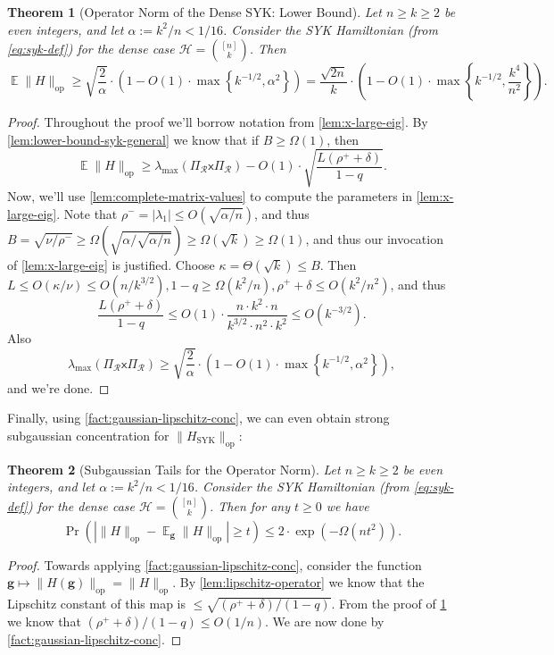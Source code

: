 \documentclass
[11pt,letterpaper]
{article}
\newtheorem{theorem}{Theorem}[section]
\theoremstyle{definition}
\newcommand{\op}{\operatorname{op}}
\newcommand{\sfx}{\mathsf x}
\newcommand{\1}{\mathbf{1}}
\newcommand{\cH}{\mathcal H}
\DeclareMathOperator*{\E}{\mathbb{E}}
\newcommand{\cR}{\mathcal R}
\renewcommand{\geq}{\geqslant}
\renewcommand{\leq}{\leqslant}
\newcommand{\syk}{\operatorname{SYK}}
\begin{document}
\begin{theorem}[Operator Norm of the Dense SYK: Lower Bound]\label{thm:syk-spectral-norm-lower}
    Let $n\geq k\geq 2$ be even integers, and let $\alpha:= k^2/n < 1/16$. Consider the SYK Hamiltonian (from \cref{eq:syk-def}) for the dense case $\cH = \binom{[n]}{k}$. Then 
    \[\E\|H\|_{\operatorname{op}}\geq \sqrt{\frac{2}{\alpha}}\cdot\left(1 - O(1)\cdot\max\left\{k^{-1/2}, \alpha^2\right\}\right) = \frac{\sqrt{2n}}{k}\cdot\left(1 - O(1)\cdot\max\left\{k^{-1/2}, \frac{k^4}{n^2}\right\}\right).\]
\end{theorem}
\begin{proof}
    Throughout the proof we'll borrow notation from \cref{lem:x-large-eig}. By \cref{lem:lower-bound-syk-general} we know that if $B\geq\Omega(1)$, then
    \[\E\|H\|_{\operatorname{op}}\geq \lambda_{\max}(\Pi_\cR\sfx\Pi_\cR) - O(1)\cdot \sqrt{\frac{L(\rho^+ + \delta)}{1 - q}}.\]
    Now, we'll use \cref{lem:complete-matrix-values} to compute the parameters in \cref{lem:x-large-eig}. Note that $\rho^- = |\lambda_1|\leq O(\sqrt{\alpha/n})$, and thus $B = \sqrt{\nu/\rho^-} \geq\Omega\left(\sqrt{\alpha/\sqrt{\alpha/n}}\right)\geq\Omega(\sqrt{k})\geq\Omega(1)$, and thus our invocation of \cref{lem:x-large-eig} is justified. Choose $\kappa = \Theta(\sqrt{k})\leq B$. Then $L\leq O(\kappa/\nu)\leq O(n/k^{3/2}), 1 - q\geq\Omega(k^2/n), \rho^+ + \delta\leq O(k^2/n^2)$, and thus 
    \[\frac{L(\rho^+ + \delta)}{1 - q}\leq O(1)\cdot\frac{n\cdot k^2\cdot n}{k^{3/2}\cdot n^2\cdot k^2}\leq O(k^{-3/2}).\]
    Also 
    \[\lambda_{\max}(\Pi_\cR\sfx\Pi_\cR)\geq \sqrt{\frac{2}{\alpha}}\cdot\left(1 - O(1)\cdot\max\left\{k^{-1/2}, \alpha^2\right\}\right),\]
    and we're done.
\end{proof}

Finally, using \cref{fact:gaussian-lipschitz-conc}, we can even obtain strong subgaussian concentration for $\|H_{\syk}\|_{\op}$:

\begin{theorem}[Subgaussian Tails for the Operator Norm]\label{thm:syk-subgaussian}
    Let $n\geq k\geq 2$ be even integers, and let $\alpha:= k^2/n < 1/16$. Consider the SYK Hamiltonian (from \cref{eq:syk-def}) for the dense case $\cH = \binom{[n]}{k}$. Then for any $t\geq 0$ we have
    \[\Pr\left(|\|H\|_{\operatorname{op}} - \E_{\bm g}\|H\|_{\operatorname{op}}|\geq t\right)\leq 2\cdot\exp\left(-\Omega(nt^2)\right).\]
\end{theorem}
\begin{proof}
    Towards applying \cref{fact:gaussian-lipschitz-conc}, consider the function $\bm g\mapsto \|H(\bm g)\|_{\op} = \|H\|_{\op}$. By \cref{lem:lipschitz-operator} we know that the Lipschitz constant of this map is $\leq\sqrt{(\rho^+ + \delta)/(1 - q)}$. From the proof of \cref{thm:syk-spectral-norm-lower} we know that $(\rho^+ + \delta)/(1 - q)\leq O(1/n)$. We are now done by \cref{fact:gaussian-lipschitz-conc}.
\end{proof}
\end{document}
